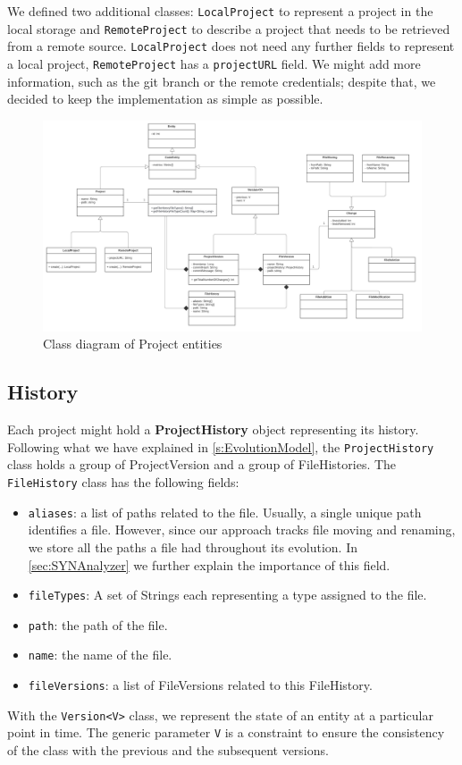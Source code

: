 We defined two additional classes: \texttt{LocalProject} to represent a project in the local storage and \texttt{RemoteProject} to describe a project that needs to be retrieved from a remote source. 
\texttt{LocalProject} does not need any further fields to represent a local project, \texttt{RemoteProject} has a \texttt{projectURL} field. We might add more information, such as the git branch or the remote credentials; despite that, we decided to keep the implementation as simple as possible. 


\begin{figure}
    \center
    \includegraphics[width=\textwidth]{SYNClass.png}
    \caption{Class diagram of Project entities}
    \label{fig:SYNCLass}
\end{figure}

\subsection*{History}

Each project might hold a \textbf{ProjectHistory} object representing its history. 
Following what we have explained in \autoref{s:EvolutionModel}, the \texttt{ProjectHistory} class holds a group of ProjectVersion and a group of FileHistories. The \texttt{FileHistory} class has the following fields:
\begin{itemize}
    \item \texttt{aliases}: a list of paths related to the file. Usually, a single unique path identifies a file. However, since our approach tracks file moving and renaming, we store all the paths a file had throughout its evolution. In \autoref{sec:SYNAnalyzer} we further explain the importance of this field. 
    \item \texttt{fileTypes}: A set of Strings each representing a type assigned to the file. 
    \item \texttt{path}: the path of the file. 
    \item \texttt{name}: the name of the file.
    \item \texttt{fileVersions}: a list of FileVersions related to this FileHistory. 
\end{itemize}
With the \texttt{Version<V>} class, we represent the state of an entity at a particular point in time. 
The generic parameter \texttt{V} is a constraint to ensure the consistency of the class with the previous and the subsequent versions. 

